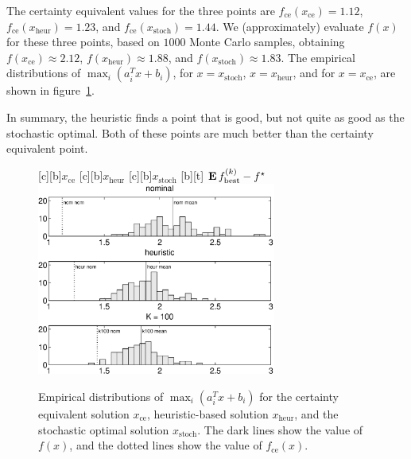\documentclass[12pt]{article}
\begin{document}
The certainty equivalent values for the three points are
$f_\mathrm{ce}(x_\mathrm{ce}) = 1.12$,
$f_\mathrm{ce}(x_\mathrm{heur}) = 1.23$, and
$f_\mathrm{ce}(x_\mathrm{stoch}) = 1.44$.
We (approximately) evaluate $f(x)$ for these three points,
based on $1000$ Monte Carlo samples, obtaining
$f(x_\mathrm{ce}) \approx 2.12$,
$f(x_\mathrm{heur}) \approx 1.88$, and
$f(x_\mathrm{stoch}) \approx 1.83$.
The empirical distributions of $\max_i (a_i^T x + b_i)$,
for $x=x_\mathrm{stoch}$, $x = x_\mathrm{heur}$, and
for $x=x_\mathrm{ce}$,
are shown in figure~\ref{f-stoch-pwl-fbest-dist}.

In summary, the heuristic finds a point that is good, but not
quite as good as the stochastic optimal.
Both of these points are much better than the certainty equivalent
point.

\begin{figure}
\begin{center}
[c][b]{$x_\mathrm{ce}$}
[c][b]{$x_\mathrm{heur}$}
[c][b]{$x_\mathrm{stoch}$}
[b][t]
{$\mathop{\bf E{}} f_\mathrm{best}^{(k)} - f^\star$}
\includegraphics[width=0.7\textwidth]{matlab/expected_pwl_fbest_dist}
\end{center}
\caption{Empirical distributions of
$\max_i (a_i^Tx + b_i)$ for the certainty equivalent solution
$x_\mathrm{ce}$, heuristic-based solution $x_\mathrm{heur}$,
and the stochastic optimal solution $x_\mathrm{stoch}$.
The dark lines show the value of $f(x)$, and the dotted lines
show the value of $f_\mathrm{ce}(x)$.
}
\label{f-stoch-pwl-fbest-dist}
\end{figure}
\end{document}
